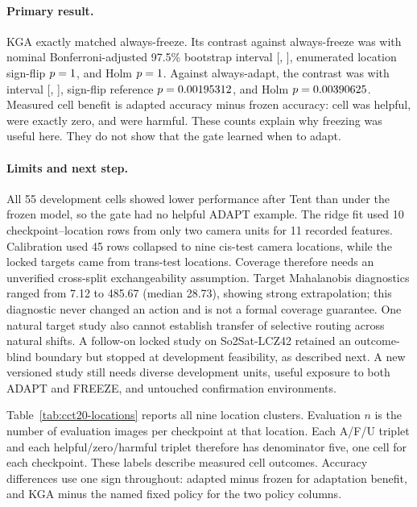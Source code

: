\paragraph{Primary result.}
KGA exactly matched always-freeze. Its contrast against always-freeze was \CCTVsFreezePoint{} with
nominal Bonferroni-adjusted 97.5\% bootstrap interval [\CCTVsFreezeCILower, \CCTVsFreezeCIUpper],
enumerated location sign-flip
$p=1$, and Holm $p=1$. Against always-adapt, the contrast was
\CCTVsAdaptPoint{} with interval [\CCTVsAdaptCILower, \CCTVsAdaptCIUpper], sign-flip reference
$p=0.00195312$, and Holm $p=0.00390625$. Measured cell benefit is adapted accuracy minus
frozen accuracy: \CCTHelpfulCount{} cell was helpful, \CCTZeroCount{} were exactly zero, and
\CCTHarmfulCount{} were harmful. These counts explain why freezing was useful here. They do not
show that the gate learned when to adapt.

\paragraph{Limits and next step.}
All 55 development cells showed lower performance after Tent than under the frozen model, so the
gate had no helpful ADAPT example. The
ridge fit used 10 checkpoint--location rows from only two camera units for 11 recorded features.
Calibration used 45 rows collapsed to nine cis-test camera locations, while the locked targets came
from trans-test locations. Coverage therefore needs an unverified cross-split exchangeability
assumption. Target Mahalanobis diagnostics ranged from 7.12 to 485.67 (median 28.73), showing strong
extrapolation; this diagnostic never changed an action and is not a formal coverage guarantee. One
natural target study also cannot establish transfer of selective routing across natural shifts. A
follow-on locked study on So2Sat-LCZ42 retained an outcome-blind boundary but stopped at development
feasibility, as described next. A new versioned study still needs diverse development units, useful exposure to both ADAPT and
FREEZE, and untouched confirmation environments.
\CCTSecondaryMetricDisclosure



Table~\ref{tab:cct20-locations} reports all nine location clusters. Evaluation $n$ is the number of
evaluation images per checkpoint at that location. Each A/F/U triplet and each
helpful/zero/harmful triplet therefore has denominator five, one cell for each checkpoint. These
labels describe measured cell outcomes. Accuracy differences use one sign throughout: adapted minus frozen for adaptation benefit, and KGA minus the
named fixed policy for the two policy columns.

